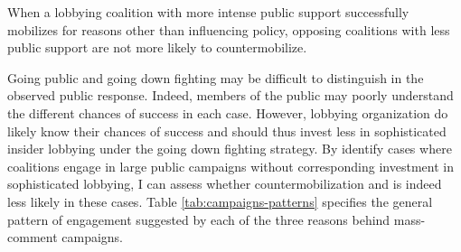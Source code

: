 \documentclass[
      12pt,
        ]{article}
\begin{document}
When a lobbying coalition with more intense public support successfully
mobilizes for reasons other than influencing policy, opposing coalitions
with less public support are not more likely to countermobilize.

Going public and going down fighting may be difficult to distinguish in
the observed public response. Indeed, members of the public may poorly
understand the different chances of success in each case. However,
lobbying organization do likely know their chances of success and should
thus invest less in sophisticated insider lobbying under the going down
fighting strategy. By identify cases where coalitions engage in large
public campaigns without corresponding investment in sophisticated
lobbying, I can assess whether countermobilization and is indeed less
likely in these cases. Table
\ref{tab:campaigns-patterns} specifies the general pattern of
engagement suggested by each of the three reasons behind mass-comment
campaigns.
\end{document}

